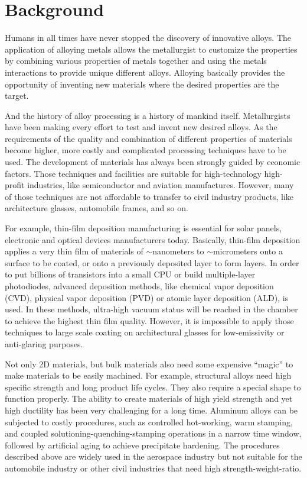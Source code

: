 \section{Background}

Humans in all times have never stopped the discovery of innovative alloys. The application of alloying metals allows the metallurgist to customize the properties by combining various properties of metals together and using the metals interactions to provide unique different alloys. Alloying basically provides the opportunity of inventing new materials where the desired properties are the target.

And the history of alloy processing is a history of mankind itself. Metallurgists have been making every effort to test and invent new desired alloys. As the requirements of the quality and combination of different properties of materials become higher, more costly and complicated processing techniques have to be used. The development of materials has always been strongly guided by economic factors. Those techniques and facilities are suitable for high-technology high-profit industries, like semiconductor and aviation manufactures. However, many of those techniques are not affordable to transfer to civil industry products, like architecture glasses, automobile frames, and so on.

For example, thin-film deposition manufacturing is essential for solar panels, electronic and optical devices manufacturers today. Basically, thin-film deposition applies a very thin film of materials of $\sim$nanometers to $\sim$micrometers onto a surface to be coated, or onto a previously deposited layer to form layers. In order to put billions of transistors into a small CPU or build multiple-layer photodiodes, advanced deposition methods, like chemical vapor deposition (CVD), physical vapor deposition (PVD) or atomic layer deposition (ALD), is used. In these methods, ultra-high vacuum status will be reached in the chamber to achieve the highest thin film quality. However, it is impossible to apply those techniques to large scale coating on architectural glasses for low-emissivity or anti-glaring purposes.

Not only 2D materials, but bulk materials also need some expensive ``magic'' to make materials to be easily machined. For example, structural alloys need high specific strength and long product life cycles. They also require a special shape to function properly. The ability to create materials of high yield strength and yet high ductility has been very challenging for a long time. Aluminum alloys can be subjected to costly procedures, such as controlled hot-working, warm stamping, and coupled solutioning-quenching-stamping operations in a narrow time window, followed by artificial aging to achieve precipitate hardening. The procedures described above are widely used in the aerospace industry but not suitable for the automobile industry or other civil industries that need high strength-weight-ratio.

